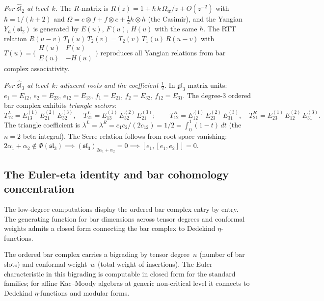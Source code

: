 \begin{construction}
\emph{For $\widehat{\mathfrak{sl}}_2$ at level~$k$.}
The $R$-matrix is $R(z)=1+\hbar\,k\,\Omega_{\mathrm{tr}}/z+O(z^{-2})$ with
$\hbar=1/(k+2)$ and
$\Omega=e\otimes f+f\otimes e+\tfrac12 h\otimes h$
(the Casimir), and the Yangian $Y_\hbar(\mathfrak{sl}_2)$
is generated by $E(u)$, $F(u)$, $H(u)$ with
the same $\hbar$. The RTT relation
$R(u{-}v)\,T_1(u)\,T_2(v)=T_2(v)\,T_1(u)\,R(u{-}v)$
with $T(u)=\bigl(\begin{smallmatrix}
H(u) & F(u) \\ E(u) & -H(u)
\end{smallmatrix}\bigr)$
reproduces all Yangian relations from bar complex
associativity.

\emph{For $\widehat{\mathfrak{sl}}_3$ at level~$k$:
adjacent roots and the coefficient $\frac12$.}
In $\mathfrak{gl}_3$ matrix units:
$e_1=E_{12}$, $e_2=E_{23}$, $e_{12}=E_{13}$,
$f_1=E_{21}$, $f_2=E_{32}$, $f_{12}=E_{31}$.
The degree-$3$ ordered bar complex exhibits
\emph{triangle sectors}:
\[
T^L_{12}=E_{13}^{(1)}\,E_{21}^{(2)}\,E_{32}^{(3)},
\quad
T^L_{21}=E_{13}^{(1)}\,E_{32}^{(2)}\,E_{21}^{(3)};
\qquad
T^R_{12}=E_{12}^{(1)}\,E_{23}^{(2)}\,E_{31}^{(3)},
\quad
T^R_{21}=E_{23}^{(1)}\,E_{12}^{(2)}\,E_{31}^{(3)}.
\]
The triangle coefficient is
$\lambda^L=\lambda^R=c_1 c_2/(2c_{12})=1/2=\int_0^1(1-t)\,dt$
(the $n=2$ beta integral). The Serre relation follows from
root-space vanishing:
$2\alpha_1+\alpha_2\notin\Phi(\mathfrak{sl}_3)
\implies (\mathfrak{sl}_3)_{2\alpha_1+\alpha_2}=0
\implies [e_1,[e_1,e_2]]=0$.
\end{construction}

\subsection{The Euler-eta identity and bar cohomology concentration}
\label{subsec:euler-eta-identity}

The low-degree computations display the ordered bar complex entry
by entry. The generating function for bar dimensions across tensor
degrees and conformal weights admits a closed form connecting the
bar complex to Dedekind $\eta$-functions.

The ordered bar complex carries a bigrading by tensor degree~$n$
(number of bar slots) and conformal weight~$w$ (total weight of
insertions). The Euler characteristic in this bigrading is
computable in closed form for the standard families; for affine
Kac--Moody algebras at generic non-critical level it connects to
Dedekind $\eta$-functions and modular forms.

